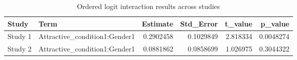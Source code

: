 \begin{table}

\caption{Ordered logit interaction results across studies}
\centering
\begin{tabular}[t]{llrrrr}
\toprule
Study & Term & Estimate & Std\_Error & t\_value & p\_value\\
\midrule
Study 1 & Attractive\_condition1:Gender1 & 0.2902458 & 0.1029849 & 2.818334 & 0.0048274\\
Study 2 & Attractive\_condition1:Gender1 & 0.0881862 & 0.0858699 & 1.026975 & 0.3044322\\
\bottomrule
\end{tabular}
\end{table}
